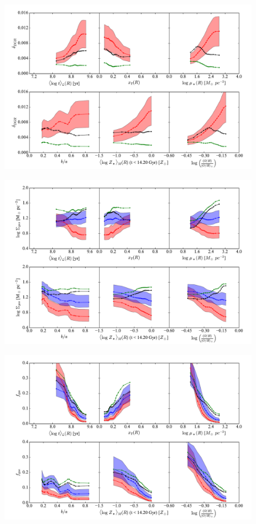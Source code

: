 \begin{figure}
	\centering
	\includegraphics[width=0.99\textwidth]{figuras/props_DGR.pdf}
	\caption[Propriedades versos $\delta_{\mathrm{DGR}}$.]
	{}
	\label{fig:propsDGR}
\end{figure}
\begin{figure}
	\centering
	\includegraphics[width=0.99\textwidth]{figuras/props_SigmaGas.pdf}
	\caption[Propriedades versos $\SigmaGas$.]
	{}
	\label{fig:propsSigmaGas}
\end{figure}
\begin{figure}
	\centering
	\includegraphics[width=0.99\textwidth]{figuras/props_fGas.pdf}
	\caption[Propriedades versos $f_{\mathrm{gas}}$.]
	{}
	\label{fig:propsfGas}
\end{figure}


